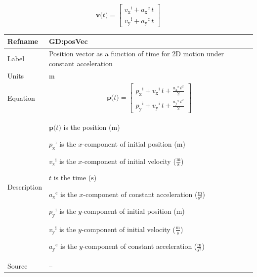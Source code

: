 \documentclass[12pt]{article}
\begin{document}
\begin{displaymath}
\symbf{v}\text{(}t\text{)}=\begin{bmatrix}
                           {{v_{\text{x}}}^{\text{i}}}+{{a_{\text{x}}}^{\text{c}}}\,t\\
                           {{v_{\text{y}}}^{\text{i}}}+{{a_{\text{y}}}^{\text{c}}}\,t
                           \end{bmatrix}
\end{displaymath}
\medskip
\noindent
\begin{minipage}{\textwidth}
\begin{tabular}{>{\raggedright}p{}>{\raggedright\arraybackslash}p{}}
\toprule \textbf{Refname} & \textbf{GD:posVec}
\label{GD:posVec}
\\ \midrule
Label & Position vector as a function of time for 2D motion under constant acceleration
        
\\ \midrule
Units & ${\text{m}}$
        
\\ \midrule
Equation & \begin{displaymath}
           \symbf{p}\text{(}t\text{)}=\begin{bmatrix}
                                      {{p_{\text{x}}}^{\text{i}}}+{{v_{\text{x}}}^{\text{i}}}\,t+\frac{{{a_{\text{x}}}^{\text{c}}}\,t^{2}}{2}\\
                                      {{p_{\text{y}}}^{\text{i}}}+{{v_{\text{y}}}^{\text{i}}}\,t+\frac{{{a_{\text{y}}}^{\text{c}}}\,t^{2}}{2}
                                      \end{bmatrix}
           \end{displaymath}
\\ \midrule
Description & \begin{symbDescription}
              \item{$\symbf{p}\text{(}t\text{)}$ is the position (${\text{m}}$)}
              \item{${{p_{\text{x}}}^{\text{i}}}$ is the $x$-component of initial position (${\text{m}}$)}
              \item{${{v_{\text{x}}}^{\text{i}}}$ is the $x$-component of initial velocity ($\frac{\text{m}}{\text{s}}$)}
              \item{$t$ is the time (${\text{s}}$)}
              \item{${{a_{\text{x}}}^{\text{c}}}$ is the $x$-component of constant acceleration ($\frac{\text{m}}{\text{s}^{2}}$)}
              \item{${{p_{\text{y}}}^{\text{i}}}$ is the $y$-component of initial position (${\text{m}}$)}
              \item{${{v_{\text{y}}}^{\text{i}}}$ is the $y$-component of initial velocity ($\frac{\text{m}}{\text{s}}$)}
              \item{${{a_{\text{y}}}^{\text{c}}}$ is the $y$-component of constant acceleration ($\frac{\text{m}}{\text{s}^{2}}$)}
              \end{symbDescription}
\\ \midrule
Source & --
         

\end{tabular}
\end{minipage}
\end{document}
